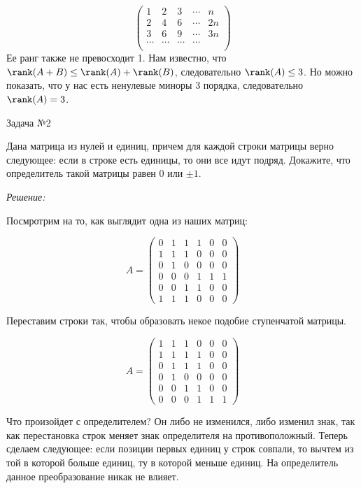 \documentclass[10pt]{article}
\begin{document}
\[
\begin{pmatrix}
1 & 2 & 3 & \cdots & n \\
2 & 4 & 6 & \cdots & 2n \\
3 & 6 & 9 & \cdots & 3n \\
\cdots & \cdots & \cdots & \cdots \\
\end{pmatrix}
\]
Ее ранг также не превосходит 1. Нам известно, что $\rank(A + B) \leq \rank(A) + \rank(B)$, следовательно $\rank(A) \leq 3$. Но можно показать, что у нас есть ненулевые миноры 3 порядка, следовательно $\rank(A) = 3$.

\hspace{2mm}

Задача №2

Дана матрица из нулей и единиц, причем для каждой строки матрицы верно следующее: если в строке есть единицы, то они все идут подряд. Докажите, что определитель такой матрицы равен 0 или $\pm 1$.

\textit{Решение:}

Посмротрим на то, как выглядит одна из наших матриц:

\[
A = \begin{pmatrix}
0 & 1 & 1 & 1 & 0 & 0 \\
1 & 1 & 1 & 0 & 0 & 0 \\
0 & 1 & 0 & 0 & 0 & 0 \\
0 & 0 & 0 & 1 & 1 & 1 \\
0 & 0 & 1 & 1 & 0 & 0 \\
1 & 1 & 1 & 0 & 0 & 0
\end{pmatrix}
\]

Переставим строки так, чтобы образовать некое подобие ступенчатой матрицы.

\[
A = \begin{pmatrix}
1 & 1 & 1 & 0 & 0 & 0 \\
1 & 1 & 1 & 1 & 0 & 0 \\
0 & 1 & 1 & 1 & 0 & 0 \\
0 & 1 & 0 & 0 & 0 & 0 \\
0 & 0 & 1 & 1 & 0 & 0 \\
0 & 0 & 0 & 1 & 1 & 1
\end{pmatrix}
\]

Что произойдет с определителем? Он либо не изменился, либо изменил знак, так как перестановка строк меняет знак определителя на противоположный. Теперь сделаем следующее: если позиции первых единиц у строк совпали, то вычтем из той в которой больше единиц, ту в которой меньше единиц. На определитель данное преобразование никак не влияет.
\end{document}
